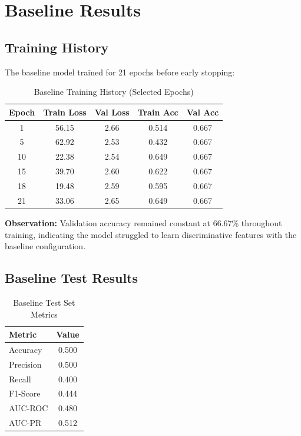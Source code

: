 \section{Baseline Results}

\subsection{Training History}

The baseline model trained for 21 epochs before early stopping:

\begin{table}[H]
\centering
\caption{Baseline Training History (Selected Epochs)}
\label{tab:baseline_training}
\begin{tabular}{ccccc}
\toprule
\textbf{Epoch} & \textbf{Train Loss} & \textbf{Val Loss} & \textbf{Train Acc} & \textbf{Val Acc} \\
\midrule
1 & 56.15 & 2.66 & 0.514 & 0.667 \\
5 & 62.92 & 2.53 & 0.432 & 0.667 \\
10 & 22.38 & 2.54 & 0.649 & 0.667 \\
15 & 39.70 & 2.60 & 0.622 & 0.667 \\
18 & 19.48 & 2.59 & 0.595 & 0.667 \\
21 & 33.06 & 2.65 & 0.649 & 0.667 \\
\bottomrule
\end{tabular}
\end{table}

\textbf{Observation:} Validation accuracy remained constant at 66.67\% throughout training, indicating the model struggled to learn discriminative features with the baseline configuration.

\subsection{Baseline Test Results}

\begin{table}[H]
\centering
\caption{Baseline Test Set Metrics}
\label{tab:baseline_test_metrics}
\begin{tabular}{lc}
\toprule
\textbf{Metric} & \textbf{Value} \\
\midrule
Accuracy & 0.500 \\
Precision & 0.500 \\
Recall & 0.400 \\
F1-Score & 0.444 \\
AUC-ROC & 0.480 \\
AUC-PR & 0.512 \\
\bottomrule
\end{tabular}
\end{table}

